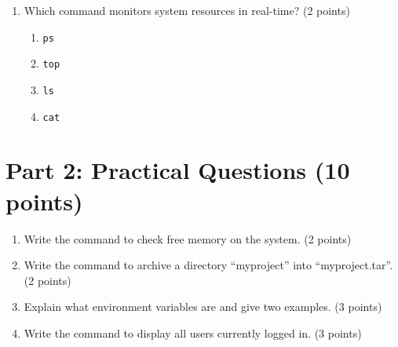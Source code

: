 \documentclass[11pt,a4paper]{article}
\begin{document}
{\begin{enumerate}[label=\textbf{\arabic*.}]
    \item Which command monitors system resources in real-time? (2 points)
    \begin{enumerate}[label=(\alph*)]
        \item \texttt{ps}
        \item \texttt{top}
        \item \texttt{ls}
        \item \texttt{cat}
    \end{enumerate}
\end{enumerate}

\section*{Part 2: Practical Questions (10 points)}

\begin{enumerate}[label=\textbf{\arabic*.}, resume]
    \item Write the command to check free memory on the system. (2 points)
    
    \vspace{2cm}
    
    \item Write the command to archive a directory ``myproject'' into ``myproject.tar''. (2 points)
    
    \vspace{2cm}
    
    \item Explain what environment variables are and give two examples. (3 points)
    
    \vspace{3cm}
    
    \item Write the command to display all users currently logged in. (3 points)
    
    \vspace{3cm}
\end{enumerate}
}
\end{document}
